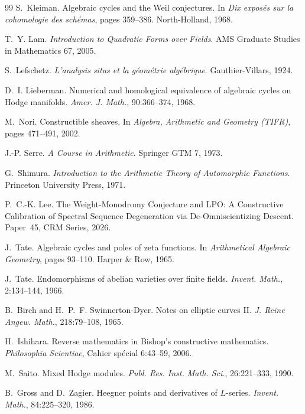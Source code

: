 \documentclass[11pt]{article}
\theoremstyle{definition}
\theoremstyle{remark}
\begin{document}
\begin{thebibliography}{99}
S.~Kleiman.
\newblock Algebraic cycles and the Weil conjectures.
\newblock In \emph{Dix expos\'es sur la cohomologie des sch\'emas}, pages 359--386. North-Holland, 1968.

T.~Y. Lam.
\newblock \emph{Introduction to Quadratic Forms over Fields}.
\newblock AMS Graduate Studies in Mathematics 67, 2005.

S.~Lefschetz.
\newblock \emph{L'analysis situs et la g\'eom\'etrie alg\'ebrique}.
\newblock Gauthier-Villars, 1924.

D.~I. Lieberman.
\newblock Numerical and homological equivalence of algebraic cycles on Hodge manifolds.
\newblock \emph{Amer. J. Math.}, 90:366--374, 1968.

M.~Nori.
\newblock Constructible sheaves.
\newblock In \emph{Algebra, Arithmetic and Geometry (TIFR)}, pages 471--491, 2002.

J.-P. Serre.
\newblock \emph{A Course in Arithmetic}.
\newblock Springer GTM 7, 1973.

G.~Shimura.
\newblock \emph{Introduction to the Arithmetic Theory of Automorphic Functions}.
\newblock Princeton University Press, 1971.

P.~C.-K. Lee.
\newblock The Weight-Monodromy Conjecture and LPO: A Constructive Calibration of Spectral Sequence Degeneration via De-Omniscientizing Descent.
\newblock Paper~45, CRM Series, 2026.

J.~Tate.
\newblock Algebraic cycles and poles of zeta functions.
\newblock In \emph{Arithmetical Algebraic Geometry}, pages 93--110. Harper \& Row, 1965.

J.~Tate.
\newblock Endomorphisms of abelian varieties over finite fields.
\newblock \emph{Invent. Math.}, 2:134--144, 1966.

B.~Birch and H.~P.~F. Swinnerton-Dyer.
\newblock Notes on elliptic curves II.
\newblock \emph{J. Reine Angew. Math.}, 218:79--108, 1965.

H.~Ishihara.
\newblock Reverse mathematics in Bishop's constructive mathematics.
\newblock \emph{Philosophia Scientiae}, Cahier sp\'ecial 6:43--59, 2006.

M.~Saito.
\newblock Mixed Hodge modules.
\newblock \emph{Publ. Res. Inst. Math. Sci.}, 26:221--333, 1990.

B.~Gross and D.~Zagier.
\newblock Heegner points and derivatives of $L$-series.
\newblock \emph{Invent. Math.}, 84:225--320, 1986.


\end{thebibliography}
\end{document}
